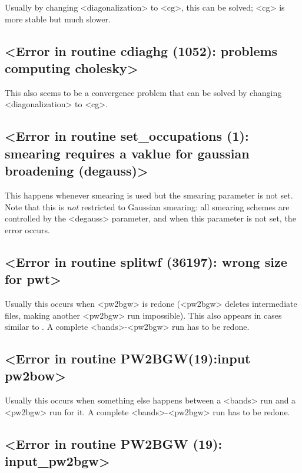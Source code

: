 \documentclass[hyperref, a4paper, 12pt]{report}
\def\texttt#1{<#1>}%
\newcommand{\shortcode}[1]{\texttt{#1}}
\begin{document}
Usually by changing \shortcode{diagonalization} to \shortcode{cg},
this can be solved; 
\shortcode{cg} is more stable but much slower.

\subsection{\shortcode{Error in routine  cdiaghg (1052):  problems computing cholesky}}

This also seems to be a convergence problem 
that can be solved by changing \shortcode{diagonalization} to \shortcode{cg}.

\subsection{\shortcode{Error in routine  set_occupations (1): smearing requires a vaklue for gaussian broadening (degauss)}}

This happens whenever smearing is used 
but the smearing parameter is not set.
Note that this is \emph{not} restricted to Gaussian smearing:
all smearing schemes are controlled by the \shortcode{degauss} parameter, 
and when this parameter is not set, 
the error occurs.

\subsection{\shortcode{Error in routine  splitwf (36197): wrong size for pwt}}

Usually this occurs when \shortcode{pw2bgw} is redone
(\shortcode{pw2bgw} deletes intermediate files, 
making another \shortcode{pw2bgw} run impossible).
This also appears in cases similar to .
A complete \shortcode{bands}-\shortcode{pw2bgw} run has to be redone.

\subsection{\shortcode{Error in routine PW2BGW(19):input pw2bow}}

Usually this occurs when something else happens between a \shortcode{bands} run 
and a \shortcode{pw2bgw} run for it.
A complete \shortcode{bands}-\shortcode{pw2bgw} run has to be redone.

\subsection{\shortcode{Error in routine PW2BGW (19): input_pw2bgw}}
\end{document}
